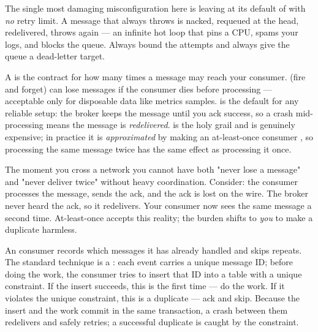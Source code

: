 \begin{secwarn}
The single most damaging misconfiguration here is leaving  at its default of  with \emph{no} retry limit. A message that always throws is nacked, requeued at the head, redelivered, throws again --- an infinite hot loop that pins a CPU, spams your logs, and blocks the queue. Always bound the attempts and always give the queue a dead-letter target.
\end{secwarn}


 A  is the contract for how many times a message may reach your consumer.  (fire and forget) can lose messages if the consumer dies before processing --- acceptable only for disposable data like metrics samples.  is the default for any reliable setup: the broker keeps the message until you ack success, so a crash mid-processing means the message is \emph{redelivered}.  is the holy grail and is genuinely expensive; in practice it is \emph{approximated} by making an at-least-once consumer , so processing the same message twice has the same effect as processing it once.

 The moment you cross a network you cannot have both "never lose a message" and "never deliver twice" without heavy coordination. Consider: the consumer processes the message, sends the ack, and the ack is lost on the wire. The broker never heard the ack, so it redelivers. Your consumer now sees the same message a second time. At-least-once accepts this reality; the burden shifts to \emph{you} to make a duplicate harmless.

 An  consumer records which messages it has already handled and skips repeats. The standard technique is a : each event carries a unique message ID; before doing the work, the consumer tries to insert that ID into a  table with a unique constraint. If the insert succeeds, this is the first time --- do the work. If it violates the unique constraint, this is a duplicate --- ack and skip. Because the insert and the work commit in the same transaction, a crash between them redelivers and safely retries; a successful duplicate is caught by the constraint.

